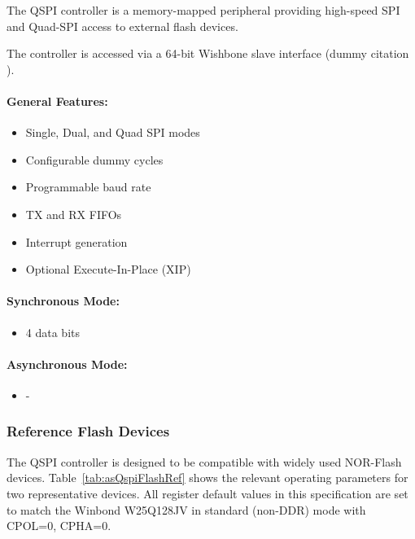 The QSPI controller is a memory-mapped peripheral providing high-speed SPI and Quad-SPI access to external flash devices.

The controller is accessed via a 64-bit Wishbone slave interface (dummy citation \cite{lehm}).

\paragraph{General Features: }
\begin{itemize}
  \item Single, Dual, and Quad SPI modes
  \item Configurable dummy cycles
  \item Programmable baud rate
  \item TX and RX FIFOs
  \item Interrupt generation
  \item Optional Execute-In-Place (XIP)
\end{itemize}

\paragraph{Synchronous Mode: }
\begin{itemize}
  \item 4 data bits
\end{itemize}

\paragraph{Asynchronous Mode: }
\begin{itemize}
  \item -
\end{itemize}

\subsubsection{Reference Flash Devices}

The QSPI controller is designed to be compatible with widely used NOR-Flash devices.
Table~\ref{tab:asQspiFlashRef} shows the relevant operating parameters for two
representative devices. All register default values in this specification are
set to match the Winbond W25Q128JV in standard (non-DDR) mode with CPOL=0, CPHA=0.

